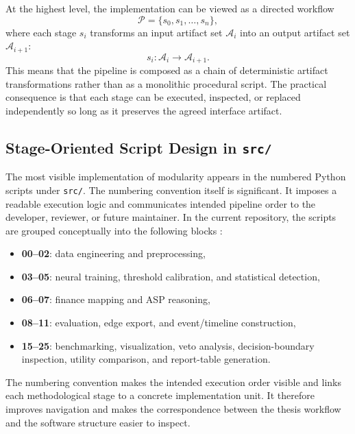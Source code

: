 At the highest level, the implementation can be viewed as a directed workflow
\begin{equation}
	\mathcal{P} =
	\{s_0, s_1, \dots, s_n\},
	\label{eq:pipeline_set}
\end{equation}
where each stage $s_i$ transforms an input artifact set $\mathcal{A}_i$ into an output artifact set $\mathcal{A}_{i+1}$:
\begin{equation}
	s_i: \mathcal{A}_i \rightarrow \mathcal{A}_{i+1}.
	\label{eq:artifact_transform}
\end{equation}
This means that the pipeline is composed as a chain of deterministic artifact transformations rather than as a monolithic procedural script. The practical consequence is that each stage can be executed, inspected, or replaced independently so long as it preserves the agreed interface artifact.

\subsection{Stage-Oriented Script Design in \texttt{src/}}

The most visible implementation of modularity appears in the numbered Python scripts under \texttt{src/}. The numbering convention itself is significant. It imposes a readable execution logic and communicates intended pipeline order to the developer, reviewer, or future maintainer. In the current repository, the scripts are grouped conceptually into the following blocks \cite{repo_thesis_grid_anomaly}:
\begin{itemize}
	\item \textbf{00--02}: data engineering and preprocessing,
	\item \textbf{03--05}: neural training, threshold calibration, and statistical detection,
	\item \textbf{06--07}: finance mapping and ASP reasoning,
	\item \textbf{08--11}: evaluation, edge export, and event/timeline construction,
	\item \textbf{15--25}: benchmarking, visualization, veto analysis, decision-boundary inspection, utility comparison, and report-table generation.
\end{itemize}

The numbering convention makes the intended execution order visible and links each methodological stage to a concrete implementation unit. It therefore improves navigation and makes the correspondence between the thesis workflow and the software structure easier to inspect.

